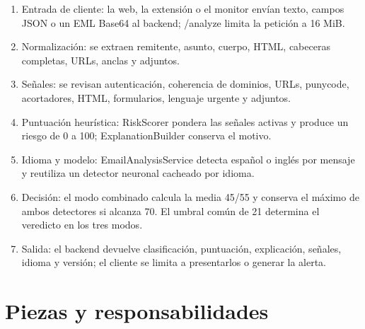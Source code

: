 \documentclass[11pt,a4paper]{article}
\begin{document}
\begin{enumerate}
  \item Entrada de cliente: la web, la extensión o el monitor envían texto, campos JSON o un EML Base64 al backend; /\allowbreak{}analyze limita la petición a 16 MiB.
  \item Normalización: se extraen remitente, asunto, cuerpo, HTML, cabeceras completas, URLs, anclas y adjuntos.
  \item Señales: se revisan autenticación, coherencia de dominios, URLs, punycode, acortadores, HTML, formularios, lenguaje urgente y adjuntos.
  \item Puntuación heurística: RiskScorer pondera las señales activas y produce un riesgo de 0 a 100; ExplanationBuilder conserva el motivo.
  \item Idioma y modelo: EmailAnalysisService detecta español o inglés por mensaje y reutiliza un detector neuronal cacheado por idioma.
  \item Decisión: el modo combinado calcula la media 45/\allowbreak{}55 y conserva el máximo de ambos detectores si alcanza 70. El umbral común de 21 determina el veredicto en los tres modos.
  \item Salida: el backend devuelve clasificación, puntuación, explicación, señales, idioma y versión; el cliente se limita a presentarlos o generar la alerta.
\end{enumerate}

\section{Piezas y responsabilidades}
\end{document}
